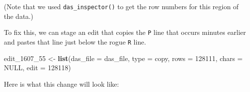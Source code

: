 \documentclass[
]{book}
\newenvironment{Shaded}{\begin{snugshade}}{\end{snugshade}}
\newcommand{\AttributeTok}[1]{\textcolor[rgb]{0.13,0.29,0.53}{#1}}
\newcommand{\ConstantTok}[1]{\textcolor[rgb]{0.56,0.35,0.01}{#1}}
\newcommand{\DecValTok}[1]{\textcolor[rgb]{0.00,0.00,0.81}{#1}}
\newcommand{\FunctionTok}[1]{\textcolor[rgb]{0.13,0.29,0.53}{\textbf{#1}}}
\newcommand{\NormalTok}[1]{#1}
\newcommand{\OtherTok}[1]{\textcolor[rgb]{0.56,0.35,0.01}{#1}}
\newcommand{\StringTok}[1]{\textcolor[rgb]{0.31,0.60,0.02}{#1}}
\begin{document}
(Note that we used \texttt{das\_inspector()} to get the row numbers for this region of the data.)

To fix this, we can stage an edit that copies the \texttt{P} line that occurs minutes earlier and pastes that line just below the rogue \texttt{R} line.

\begin{Shaded}
\begin{Highlighting}[]
\NormalTok{edit\_1607\_55 }\OtherTok{\textless{}{-}} 
  \FunctionTok{list}\NormalTok{(}\AttributeTok{das\_file =}\NormalTok{ das\_file,}
       \AttributeTok{type =} \StringTok{\textquotesingle{}copy\textquotesingle{}}\NormalTok{,}
       \AttributeTok{rows =} \DecValTok{128111}\NormalTok{,}
       \AttributeTok{chars =} \ConstantTok{NULL}\NormalTok{,}
       \AttributeTok{edit =} \DecValTok{128118}\NormalTok{)}
\end{Highlighting}
\end{Shaded}

Here is what this change will look like:
\end{document}
